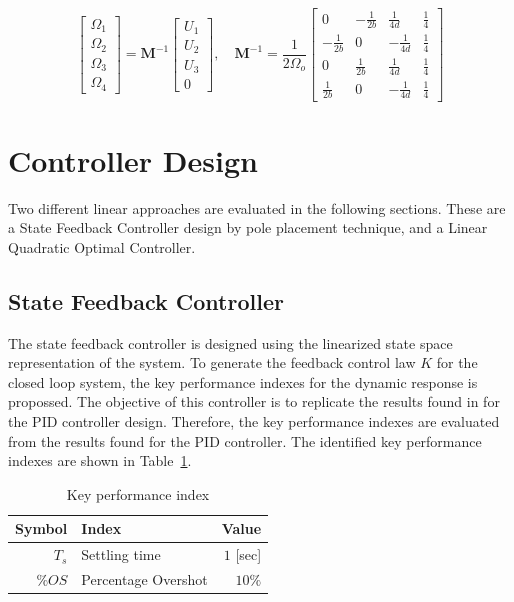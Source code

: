 \documentclass[12pt]{article}
\begin{document}
\begin{equation}
    \begin{bmatrix}
    \Omega_1 \\ \Omega_2 \\ \Omega_3 \\ \Omega_4
    \end{bmatrix} = 
    \mathbf{M}^{-1} \begin{bmatrix} U_1 \\ U_2 \\ U_3 \\ 0 \end{bmatrix},\quad
    \mathbf{M}^{-1} = \frac{1}{2 \Omega_o}
    \begin{bmatrix}
    0 & -\frac{1}{2b} & \frac{1}{4d} & \frac{1}{4} \\ 
    -\frac{1}{2b} & 0 & -\frac{1}{4d} & \frac{1}{4} \\ 
    0 & \frac{1}{2b} & \frac{1}{4d} & \frac{1}{4} \\
    \frac{1}{2b} & 0 & -\frac{1}{4d} & \frac{1}{4}
    \end{bmatrix}
\end{equation}

\section{Controller Design}

Two different linear approaches are evaluated in the following sections. These are a State Feedback Controller design by pole placement technique, and a Linear Quadratic Optimal Controller.

\subsection{State Feedback Controller}
\label{sec:state-feedback}

The state feedback controller is designed using the linearized state space representation of the system. To generate the feedback control law $K$ for the closed loop system, the key performance indexes for the dynamic response is propossed. The objective of this controller is to replicate the results found in \cite{Boua04} for the PID controller design. Therefore, the key performance indexes are evaluated from the results found for the PID controller. The identified key performance indexes are shown in Table~\ref{tab:KPI}.

\begin{table}
  \begin{center}
    \caption{Key performance index}
    \label{tab:KPI}
    \begin{tabular}{rlr}
      \hline
      Symbol & Index & Value \\
      \hline                  
      $T_s$ & Settling time & $1$ [sec]\\
      $\%OS$ & Percentage Overshot & $10\%$\\
      \hline
    \end{tabular}
  \end{center}
\end{table}
\end{document}
